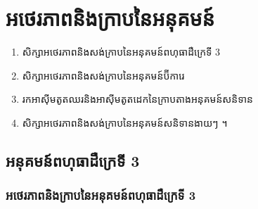 \chapter{អថេរភាពនិងក្រាបនៃអនុគមន៍}

\begin{objBox}[វត្ថុបំណង]
\begin{enumerate}[1]
  \item សិក្សាអថេរភាពនិងសង់ក្រាបនៃអនុគមន៍ពហុធាដឺក្រេទី $3$
  \item សិក្សាអថេរភាពនិងសង់ក្រាបនៃអនុគមន៍ប៊ីការេ
  \item រកអាស៊ីមតូតឈរនិងអាស៊ីមតូតដេកនៃក្រាបតាងអនុគមន៍សនិទាន
  \item សិក្សាអថេរភាពនិងសង់ក្រាបនៃអនុគមន៍សនិទានងាយៗ ។
\end{enumerate}
\end{objBox}

\section{អនុគមន៍ពហុធាដឺក្រេទី 3}
\subsection{អថេរភាពនិងក្រាបនៃអនុគមន៍ពហុធាដឺក្រេទី 3}

